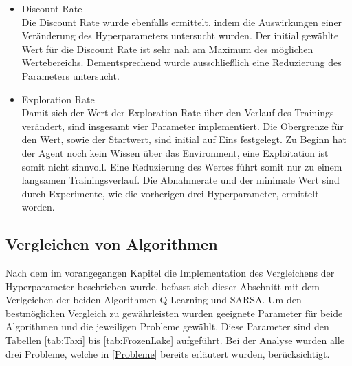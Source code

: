\begin{itemize}
    \item Discount Rate\\
    Die Discount Rate wurde ebenfalls ermittelt, indem die Auswirkungen einer Veränderung des Hyperparameters untersucht wurden. 
    Der initial gewählte Wert für die Discount Rate ist sehr nah am Maximum des möglichen Wertebereichs. 
    Dementsprechend wurde ausschließlich eine Reduzierung des Parameters untersucht.

    \item Exploration Rate\\
    Damit sich der Wert der Exploration Rate über den Verlauf des Trainings verändert, sind insgesamt vier Parameter implementiert. 
    Die Obergrenze für den Wert, sowie der Startwert, sind initial auf Eins festgelegt. 
    Zu Beginn hat der Agent noch kein Wissen über das Environment, eine Exploitation ist somit nicht sinnvoll. 
    Eine Reduzierung des Wertes führt somit nur zu einem langsamen Trainingsverlauf. 
    Die Abnahmerate und der minimale Wert sind durch Experimente, wie die vorherigen drei Hyperparameter, ermittelt worden.
\end{itemize}


\subsection{Vergleichen von Algorithmen}

Nach dem im vorangegangen Kapitel die Implementation des Vergleichens der Hyperparameter beschrieben wurde, befasst sich dieser Abschnitt mit dem Verlgeichen der beiden Algorithmen Q-Learning und SARSA. 
Um den bestmöglichen Vergleich zu gewährleisten wurden geeignete Parameter für beide Algorithmen und die jeweiligen Probleme gewählt. Diese Parameter sind den Tabellen \ref{tab:Taxi} bis \ref{tab:FrozenLake} aufgeführt. Bei der Analyse wurden alle drei Probleme, welche in \ref{Probleme} bereits erläutert wurden, berücksichtigt.




